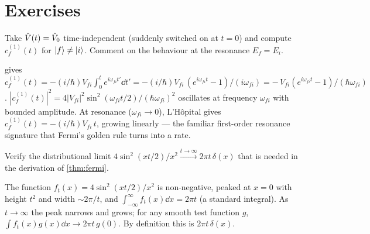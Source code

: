 \section*{Exercises}

\begin{exercise}
Take $\hat{V}(t)=\hat{V}_0$ time-independent (suddenly switched on
at $t=0$) and compute $c_f^{(1)}(t)$ for $\ket{f}\neq\ket{i}$.
Comment on the behaviour at the resonance $E_f=E_i$.
\begin{solution}
 gives
$c_f^{(1)}(t)=-(i/\hbar)V_{fi}\!\int_0^t\!e^{i\omega_{fi}t'}\dd t'
=-(i/\hbar)V_{fi}\,(e^{i\omega_{fi}t}-1)/(i\omega_{fi})
=-\,V_{fi}(e^{i\omega_{fi}t}-1)/(\hbar\omega_{fi})$.
$|c_f^{(1)}(t)|^2=4|V_{fi}|^2\sin^2(\omega_{fi}t/2)/(\hbar\omega_{fi})^2$
oscillates at frequency $\omega_{fi}$ with bounded amplitude.
At resonance ($\omega_{fi}\to 0$), L'H\^opital gives
$c_f^{(1)}(t)=-(i/\hbar)V_{fi}\,t$, growing linearly --- the
familiar first-order resonance signature that Fermi's golden rule
turns into a rate.
\end{solution}
\end{exercise}

\begin{exercise}
Verify the distributional limit
$4\sin^2(xt/2)/x^2 \xrightarrow{t\to\infty} 2\pi t\,\delta(x)$
that is needed in the derivation of \cref{thm:fermi}.
\begin{solution}
The function $f_t(x)=4\sin^2(xt/2)/x^2$ is non-negative, peaked
at $x=0$ with height $t^2$ and width $\sim 2\pi/t$, and
$\int_{-\infty}^\infty f_t(x)\dd x=2\pi t$ (a standard integral).
As $t\to\infty$ the peak narrows and grows; for any smooth test
function $g$, $\int f_t(x)g(x)\dd x\to 2\pi t\,g(0)$. By
definition this is $2\pi t\,\delta(x)$.
\end{solution}
\end{exercise}

